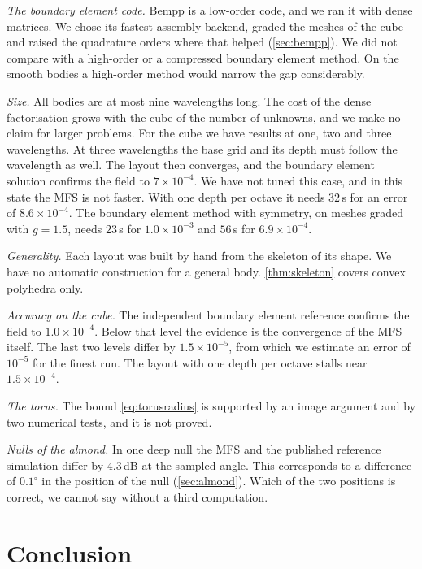 \emph{The boundary element code.} Bempp is a low-order code, and we ran it with dense matrices. We chose its fastest assembly backend, graded the meshes of the cube and raised the quadrature orders where that helped (\ref{sec:bempp}). We did not compare with a high-order or a compressed boundary element method. On the smooth bodies a high-order method would narrow the gap considerably.

\emph{Size.} All bodies are at most nine wavelengths long. The cost of the dense factorisation grows with the cube of the number of unknowns, and we make no claim for larger problems. For the cube we have results at one, two and three wavelengths. At three wavelengths the base grid and its depth must follow the wavelength as well. The layout then converges, and the boundary element solution confirms the field to $7\times10^{-4}$. We have not tuned this case, and in this state the MFS is not faster. With one depth per octave it needs $32$\,s for an error of $8.6\times10^{-4}$. The boundary element method with symmetry, on meshes graded with $g = 1.5$, needs $23$\,s for $1.0\times10^{-3}$ and $56$\,s for $6.9\times10^{-4}$.

\emph{Generality.} Each layout was built by hand from the skeleton of its shape. We have no automatic construction for a general body. \autoref{thm:skeleton} covers convex polyhedra only.

\emph{Accuracy on the cube.} The independent boundary element reference confirms the field to $1.0\times10^{-4}$. Below that level the evidence is the convergence of the MFS itself. The last two levels differ by $1.5\times10^{-5}$, from which we estimate an error of $10^{-5}$ for the finest run. The layout with one depth per octave stalls near $1.5\times10^{-4}$.

\emph{The torus.} The bound \eqref{eq:torusradius} is supported by an image argument and by two numerical tests, and it is not proved.

\emph{Nulls of the almond.} In one deep null the MFS and the published reference simulation differ by $4.3$\,dB at the sampled angle. This corresponds to a difference of $0.1^\circ$ in the position of the null (\autoref{sec:almond}). Which of the two positions is correct, we cannot say without a third computation.

\section{Conclusion}


